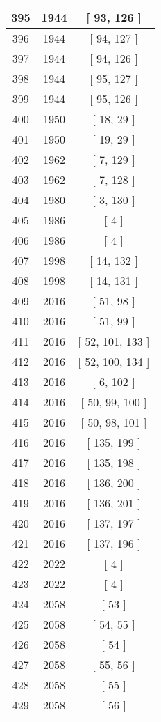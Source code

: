\begin{center}
\begin{longtable}[H]{|| c c c ||}
\hline
395 & 1944 & [ 93, 126 ] \\ 
\hline
396 & 1944 & [ 94, 127 ] \\ 
\hline
397 & 1944 & [ 94, 126 ] \\ 
\hline
398 & 1944 & [ 95, 127 ] \\ 
\hline
399 & 1944 & [ 95, 126 ] \\ 
\hline
400 & 1950 & [ 18, 29 ] \\ 
\hline
401 & 1950 & [ 19, 29 ] \\ 
\hline
402 & 1962 & [ 7, 129 ] \\ 
\hline
403 & 1962 & [ 7, 128 ] \\ 
\hline
404 & 1980 & [ 3, 130 ] \\ 
\hline
405 & 1986 & [ 4 ] \\ 
\hline
406 & 1986 & [ 4 ] \\ 
\hline
407 & 1998 & [ 14, 132 ] \\ 
\hline
408 & 1998 & [ 14, 131 ] \\ 
\hline
409 & 2016 & [ 51, 98 ] \\ 
\hline
410 & 2016 & [ 51, 99 ] \\ 
\hline
411 & 2016 & [ 52, 101, 133 ] \\ 
\hline
412 & 2016 & [ 52, 100, 134 ] \\ 
\hline
413 & 2016 & [ 6, 102 ] \\ 
\hline
414 & 2016 & [ 50, 99, 100 ] \\ 
\hline
415 & 2016 & [ 50, 98, 101 ] \\ 
\hline
416 & 2016 & [ 135, 199 ] \\ 
\hline
417 & 2016 & [ 135, 198 ] \\ 
\hline
418 & 2016 & [ 136, 200 ] \\ 
\hline
419 & 2016 & [ 136, 201 ] \\ 
\hline
420 & 2016 & [ 137, 197 ] \\ 
\hline
421 & 2016 & [ 137, 196 ] \\ 
\hline
422 & 2022 & [ 4 ] \\ 
\hline
423 & 2022 & [ 4 ] \\ 
\hline
424 & 2058 & [ 53 ] \\ 
\hline
425 & 2058 & [ 54, 55 ] \\ 
\hline
426 & 2058 & [ 54 ] \\ 
\hline
427 & 2058 & [ 55, 56 ] \\ 
\hline
428 & 2058 & [ 55 ] \\ 
\hline
429 & 2058 & [ 56 ] \\ 

\end{longtable}
\end{center}
